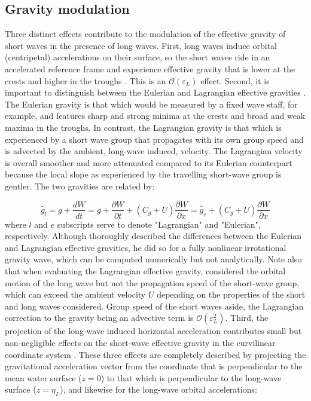 \documentclass[lineno]{jfm}
\begin{document}
\subsection{Gravity modulation}
\label{subsection:gravity_modulation}

Three distinct effects contribute to the modulation of the effective gravity of
short waves in the presence of long waves.
First, long waves induce orbital (centripetal) accelerations on their surface,
so the short waves ride in an accelerated reference frame and experience effective
gravity that is lower at the crests and higher in the troughs
\citep{longuet1986eulerian,longuet1987propagation}.
This is an $\mathcal{O}(\varepsilon_L)$ effect.
Second, it is important to distinguish between the Eulerian and Lagrangian effective
gravities \citep{longuet1986eulerian}.
The Eulerian gravity is that which would be measured by a fixed wave staff,
for example, and features sharp and strong minima at the crests and broad
and weak maxima in the troughs.
In contrast, the Lagrangian gravity is that which is experienced by a short wave
group that propagates with its own group speed and is advected by the ambient,
long-wave induced, velocity.
The Lagrangian velocity is overall smoother and more attenuated compared to
its Eulerian counterpart because the local slope as experienced by the
travelling short-wave group is gentler.
The two gravities are related by:

\begin{equation}
\label{eq:gravity_modulation_lagrangian}
\widetilde{g_l} =
g + \frac{dW}{dt} =
g + \frac{\partial W}{\partial t} + \left(C_g + U\right) \frac{\partial W}{\partial x} =
\widetilde{g_e} + \left(C_g + U\right) \frac{\partial W}{\partial x}
\end{equation}
where $l$ and $e$ subscripts serve to denote "Lagrangian" and "Eulerian",
respectively.
Although \citet{longuet1986eulerian} thoroughly described the differences
between the Eulerian and Lagrangian effective gravities, he did so for
a fully nonlinear irrotational gravity wave, which can be computed numerically
but not analytically.
Note also that when evaluating the Lagrangian effective gravity,
\citet{longuet1987propagation} considered the orbital motion of the long wave
but not the propagation speed of the short-wave group, which can exceed the
ambient velocity $U$ depending on the properties of the short and long waves
considered.
Group speed of the short waves aside, the Lagrangian correction to the gravity
being an advective term is $\mathcal{O}(\varepsilon_L^2)$.
Third, the projection of the long-wave induced horizontal acceleration
contributes small but non-negligible effects on the short-wave effective
gravity in the curvilinear coordinate system
\citep{phillips1981dispersion,zhang1990evolution}.
These three effects are completely described by projecting the gravitational
acceleration vector from the coordinate that is perpendicular to the mean water
surface ($z=0$) to that which is perpendicular to the long-wave surface
($z=\eta_L$), and likewise for the long-wave orbital accelerations:
\end{document}
